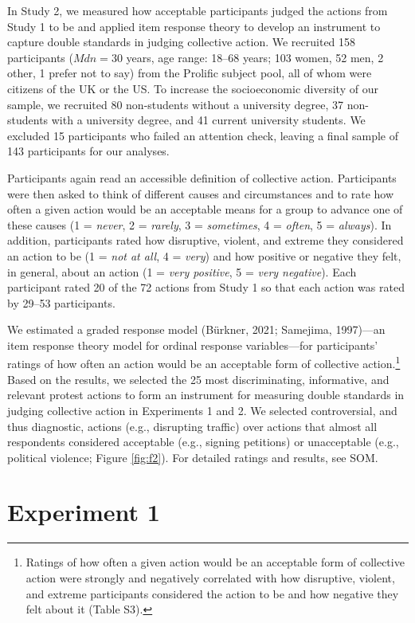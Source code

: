 \documentclass[12pt, letterpaper]{article}
\begin{document}
In Study 2, we measured how acceptable participants judged the actions
from Study 1 to be and applied item response theory to develop an
instrument to capture double standards in judging collective action. We
recruited 158 participants (\(\textit{Mdn} = 30\) years, age range:
18--68 years; 103 women, 52 men, 2 other, 1 prefer not to say) from the
Prolific subject pool, all of whom were citizens of the UK or the US. To
increase the socioeconomic diversity of our sample, we recruited 80
non-students without a university degree, 37 non-students with a
university degree, and 41 current university students. We excluded 15
participants who failed an attention check, leaving a final sample of
143 participants for our analyses.

Participants again read an accessible definition of collective action.
Participants were then asked to think of different causes and
circumstances and to rate how often a given action would be an
acceptable means for a group to advance one of these causes (1 =
\emph{never}, 2 = \emph{rarely}, 3 = \emph{sometimes}, 4 = \emph{often},
5 = \emph{always}). In addition, participants rated how disruptive,
violent, and extreme they considered an action to be (1 = \emph{not at
all}, 4 = \emph{very}) and how positive or negative they felt, in
general, about an action (1 = \emph{very positive}, 5 = \emph{very
negative}). Each participant rated 20 of the 72 actions from Study 1 so
that each action was rated by 29--53 participants.

We estimated a graded response model (Bürkner, 2021; Samejima,
1997)---an item response theory model for ordinal response
variables---for participants' ratings of how often an action would be an
acceptable form of collective action.\footnote{Ratings of how often a
  given action would be an acceptable form of collective action were
  strongly and negatively correlated with how disruptive, violent, and
  extreme participants considered the action to be and how negative they
  felt about it (Table S3).} Based on the results, we selected the 25
most discriminating, informative, and relevant protest actions to form
an instrument for measuring double standards in judging collective
action in Experiments 1 and 2. We selected controversial, and thus
diagnostic, actions (e.g., disrupting traffic) over actions that almost
all respondents considered acceptable (e.g., signing petitions) or
unacceptable (e.g., political violence; Figure \ref{fig:f2}). For
detailed ratings and results, see SOM.

\hypertarget{experiment-1}{%
\section{Experiment 1}\label{experiment-1}}
\end{document}
